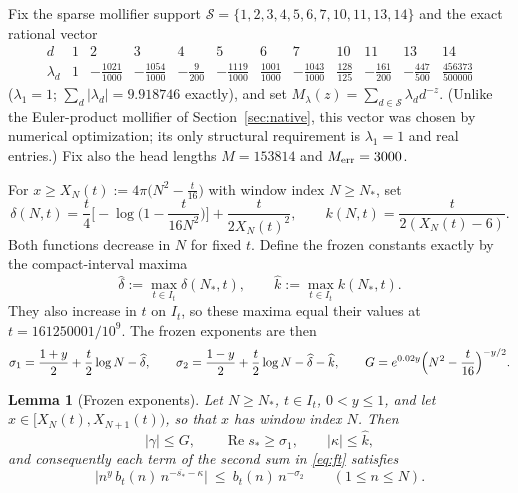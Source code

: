 \documentclass[11pt]{article}
\newtheorem{lemma}[theorem]{Lemma}
\theoremstyle{definition}
\newcommand{\calS}{\mathcal{S}}
\DeclareMathOperator{\Rea}{Re}
\begin{document}
Fix the sparse mollifier support
$\calS=\{1,2,3,4,5,6,7,10,11,13,14\}$ and the exact rational vector
\[
\begin{array}{c|ccccccccccc}
d&1&2&3&4&5&6&7&10&11&13&14\\ \hline
\lambda_d&
1&-\frac{1021}{1000}&-\frac{1054}{1000}&-\frac{9}{200}&
-\frac{1119}{1000}&\frac{1001}{1000}&-\frac{1043}{1000}&
\frac{128}{125}&-\frac{161}{200}&-\frac{447}{500}&\frac{456373}{500000}
\end{array}
\]
($\lambda_1=1$; $\sum_d|\lambda_d|=9.918746$ exactly), and set
$M_\lambda(z)=\sum_{d\in\calS}\lambda_d d^{-z}$. (Unlike the Euler-product
mollifier of Section~\ref{sec:native}, this vector was chosen by numerical optimization;
its only structural requirement is $\lambda_1=1$ and real entries.)
Fix also the head lengths $M=153814$ and $M_{\rm err}=3000$.

For $x\ge X_N(t):=4\pi\bigl(N^2-\frac t{16}\bigr)$ with window index
$N\ge N_*$, set
\[
\delta(N,t)=\frac t4\bigl[-\log\bigl(1-\frac t{16N^2}\bigr)\bigr]
+\frac{t}{2X_N(t)^2},
\qquad
k(N,t)=\frac{t}{2(X_N(t)-6)}.
\]
Both functions decrease in $N$ for fixed $t$.  Define the frozen
constants exactly by the compact-interval maxima
\[
\widehat\delta:=\max_{t\in I_t}\delta(N_*,t),
\qquad
\widehat k:=\max_{t\in I_t}k(N_*,t).
\]
They also increase in $t$ on $I_t$, so these maxima equal their values at
$t=161250001/10^9$.
The frozen exponents are then
\[
\sigma_1=\frac{1+y}{2}+\frac t2\log N-\widehat\delta,
\qquad
\sigma_2=\frac{1-y}{2}+\frac t2\log N-\widehat\delta-\widehat k,
\qquad
G=e^{0.02y}\Bigl(N^2-\frac t{16}\Bigr)^{-y/2}.
\]
\begin{lemma}[Frozen exponents]\label{lem:frozen}
Let $N\ge N_*$, $t\in I_t$, $0<y\le1$, and let
$x\in[X_N(t),X_{N+1}(t))$, so that $x$ has window index $N$. Then
\[
|\gamma|\le G,\qquad
\Rea s_*\ge\sigma_1,\qquad
|\kappa|\le\widehat k,
\]
and consequently each term of the second sum in \eqref{eq:ft}
satisfies
\[
\bigl|n^y\,b_t(n)\,n^{-\overline{s_*}-\kappa}\bigr|
\ \le\ b_t(n)\,n^{-\sigma_2}
\qquad(1\le n\le N).
\]
\end{lemma}
\end{document}
